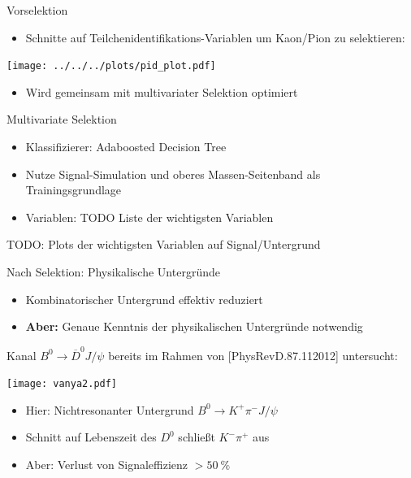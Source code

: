 \documentclass[compress,aspectratio=43]{beamer}
\begin{document}
\begin{frame}[shrink=10]{Vorselektion}
  \begin{itemize}
    \item {\small Schnitte auf Teilchenidentifikations-Variablen um Kaon/Pion zu selektieren:}
  \end{itemize}
  \centering
  \texttt{[image: ../../../plots/pid\_plot.pdf]}
  \begin{itemize}
    \item Wird gemeinsam mit multivariater Selektion optimiert
  \end{itemize}
\end{frame}

\begin{frame}{Multivariate Selektion}
  \begin{itemize}
    \item Klassifizierer: Adaboosted Decision Tree
    \item Nutze Signal-Simulation und oberes Massen-Seitenband als Trainingsgrundlage
    \item Variablen: TODO Liste der wichtigsten Variablen
  \end{itemize}
  TODO: Plots der wichtigsten Variablen auf Signal/Untergrund
\end{frame}


\begin{frame}[shrink=10]{Nach Selektion: Physikalische Untergründe}
  \begin{itemize}
    \item Kombinatorischer Untergrund effektiv reduziert
    \item \textbf{Aber:} Genaue Kenntnis der physikalischen Untergründe notwendig
  \end{itemize}
  
  {\small Kanal $B^0\!\to\! \overline{D}^0 J\!/\!\psi$ bereits im Rahmen von [PhysRevD.87.112012] untersucht:}

  \texttt{[image: vanya2.pdf]}
  \begin{itemize}
    \item Hier: Nichtresonanter Untergrund $B^0\!\to\! K^+\pi^- J\!/\!\psi$
    \item Schnitt auf Lebenszeit des $D^0$ schließt $K^-\pi^+$ aus
    \item Aber: Verlust von Signaleffizienz $> \SI{50}{\percent}$
  \end{itemize}
\end{frame}
\end{document}
